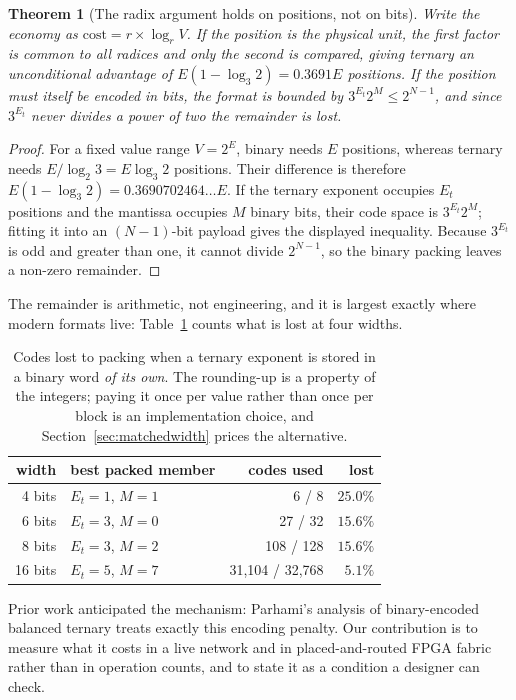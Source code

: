 \documentclass[11pt]{article}
\newtheorem{theorem}{Theorem}
\theoremstyle{definition}
\begin{document}
\begin{theorem}[The radix argument holds on positions, not on bits]
\label{thm:boundary}
Write the economy as $\text{cost} = r \times \log_r V$. If the position is the
physical unit, the first factor is common to all radices and only the second is
compared, giving ternary an unconditional advantage of $E(1-\log_3 2) = 0.3691E$
positions. If the position must itself be encoded in bits, the format is bounded
by $3^{E_t} 2^{M} \le 2^{N-1}$, and since $3^{E_t}$ never divides a power of two
the remainder is lost.
\end{theorem}
\begin{proof}
For a fixed value range $V=2^E$, binary needs $E$ positions, whereas ternary
needs $E/\log_2 3=E\log_3 2$ positions. Their difference is therefore
$E(1-\log_3 2)=0.3690702464\ldots E$. If the ternary exponent occupies
$E_t$ positions and the mantissa occupies $M$ binary bits, their code space is
$3^{E_t}2^M$; fitting it into an $(N-1)$-bit payload gives the displayed
inequality. Because $3^{E_t}$ is odd and greater than one, it cannot divide
$2^{N-1}$, so the binary packing leaves a non-zero remainder.
\end{proof}

The remainder is arithmetic, not engineering, and it is largest exactly where
modern formats live: Table~\ref{tab:packloss} counts what is lost at four widths.

\begin{table}[t]\centering
\caption{Codes lost to packing when a ternary exponent is stored in a binary
word \emph{of its own}. The rounding-up is a property of the integers; paying it
once per value rather than once per block is an implementation choice, and
Section~\ref{sec:matchedwidth} prices the alternative.}
\label{tab:packloss}
\begin{tabular}{rlrr}
\toprule
width & best packed member & codes used & lost \\
\midrule
4 bits & $E_t{=}1$, $M{=}1$ & 6 / 8 & $25.0\%$ \\
6 bits & $E_t{=}3$, $M{=}0$ & 27 / 32 & $15.6\%$ \\
8 bits & $E_t{=}3$, $M{=}2$ & 108 / 128 & $15.6\%$ \\
16 bits & $E_t{=}5$, $M{=}7$ & 31{,}104 / 32{,}768 & $5.1\%$ \\
\bottomrule
\end{tabular}
\end{table}

Prior work anticipated the mechanism: Parhami's analysis of binary-encoded
balanced ternary treats exactly this encoding penalty. Our contribution is to
measure what it costs in a live network and in placed-and-routed FPGA fabric rather
than in operation counts, and to state it as a condition a designer can check.
\end{document}
